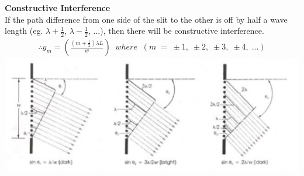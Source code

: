 \documentclass{article}
\begin{document}
\noindent\textbf{Constructive Interference}\\
If the path difference from one side of the slit to the other is off by half a wave length (eg. $\lambda + \frac{1}{2}$, $\lambda - \frac{1}{2}$, ...), then there will be constructive interference.
\begin{align*}
    \therefore y_m = \left(\frac{(m + \frac{1}{2})\lambda L}{w}\right)\;\; where\;\;(m\;=\;\pm 1,\;\pm 2,\;\pm 3,\;\pm 4,\;...)
\end{align*}\leavevmode
\includegraphics[scale=0.8]{images/wavelets} \\

\end{document}
